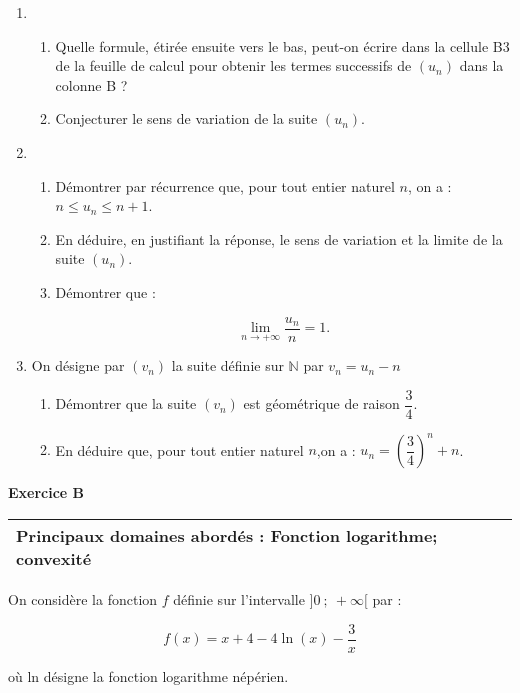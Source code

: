 \documentclass[10pt,a4paper,french]{article}
\newcommand{\N}{\mathbb{N}}
\begin{document}
\begin{enumerate}[resume]
\item
	\begin{enumerate}
		\item Quelle formule, étirée ensuite vers le bas, peut-on écrire dans la cellule B3 de la feuille de calcul pour obtenir les termes successifs de $\left(u_n\right)$ dans la colonne B ?
		\item Conjecturer le sens de variation de la suite $\left(u_n\right)$.
	\end{enumerate}
\item
	\begin{enumerate}
		\item Démontrer par récurrence que, pour tout entier naturel $n$, on a : $n \leqslant u_n \leqslant n + 1$.
		\item En déduire, en justifiant la réponse, le sens de variation et la limite de la suite 
		$\left(u_n\right)$.
		\item Démontrer que :
		
\[\displaystyle\lim_{n \to + \infty} \dfrac{u_n}{n} = 1.\]

	\end{enumerate}
\item  On désigne par $\left(v_n\right)$ la suite définie sur $\N$ par $v_n = u_n - n$
	\begin{enumerate}
		\item Démontrer que la suite $\left(v_n\right)$ est géométrique de raison $\dfrac{3}{4}$.
		\item En déduire que, pour tout entier naturel $n$,on a : $u_n = \left(\dfrac{3}{4}\right)^n + n$.
	\end{enumerate}
\end{enumerate}

\bigskip

\textbf{Exercice B}

\medskip

\begin{tabularx}{\linewidth}{|X|}\hline
\textbf{Principaux domaines abordés : Fonction logarithme; convexité}
\\ \hline
\end{tabularx}

\medskip

On considère la fonction $f$ définie sur l'intervalle $]0~;~ +\infty[$ par :

\[f(x) = x + 4 - 4 \ln (x) - \dfrac{3}{x}\]

où ln désigne la fonction logarithme népérien.
\end{document}
